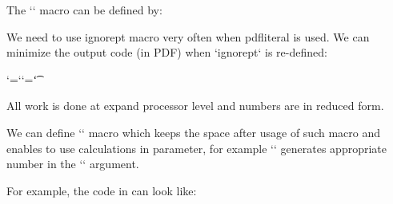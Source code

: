 The `\circletext` macro can be defined by: 

\begtt
\newdimen\tmpdimA 
\def\circletext#1#2#3#4{\hbox\bgroup 
    \tmpdim=14668pt \tmpdimA=#1 \divide\tmpdimA by256 \divide\tmpdim by\tmpdimA 
    \edef\tmpC{\expandafter\ignorept\the\tmpdim}%
    \setbox0=\hbox{\ifdim#1<0pt X\fi}%
    \tmpdimA=0pt \baselineskip=#1 \advance\baselineskip by-\ht0 \lineskiplimit=-\maxdimen 
    \tmpdim=#2pt \advance\tmpdim by-\ifdim#1<0pt-\fi 90pt 
    \def\tmpb{{}#3}\replacestrings{ }{{ }}#4%
    \pdfsave \pdfrotate{\expandafter\ignorept\the\tmpdim}%
    \expandafter\circletextA\tmpb\relax 
} 
\def\circletextA#1{\ifx#1\relax\pdfrestore\egroup\ignorespaces\else 
    \ifx^#1^\else \setbox0=\hbox{#1\circletextS}%
       \ifdim\tmpdimA=0pt \else 
          \advance\tmpdimA by.5\wd0 \dimen0=\tmpC\tmpdimA 
          \pdfrotate{-\expandafter\ignorept\the\dimen0}%
       \fi 
       \tmpdimA=.5\wd0 
       \vbox to0pt{\vss\hbox to0pt{\hss#1\hss}\null}%
    \fi 
    \expandafter\circletextA\fi 
} 
\def\kpcirc#1#2#3{\replacestrings{#1#2}{#1{\kern#3em}#2}} 
\def\circletextS{} 
\endtt

 


We need to use {\tt{}}ignorept macro very often when {\tt{}}pdfliteral is used. We can minimize the output code (in PDF) when `ignorept` is re-defined: 

\begtt
\begingroup \lccode`\?=`\p \lccode`\!=`\t \lowercase{\endgroup 
   \def\ignorept #1.#2?!{%
       \ifnum#2=0 #1\else \ifnum#1=0 \expandafter\remzero\fi #1.#2\fi} 
} 
\def\remzero #10{#1}%
\endtt


All work is done at expand processor level and numbers are in reduced form. 



We can define `\nopt[param]` macro which keeps the space after usage of such macro and enables to use calculations in parameter, for example `\nopt[1.65\hoffset + 1in]` generates appropriate number in the `\pdfliteral` argument. 

\begtt
\def\nopt[#1]{\expandafter\ignorept\the\dimexpr #1\relax} 
\endtt


For example, the code in  can look like: 

\begtt
\def\prepghook{\dimen0=.996264truein  
  \pdfliteral{q \bgcolor\space k -0.996264 0 0 0.996264 -\nopt[\dimen0] \nopt[\dimen0] cm  
  \nopt[\hoffset] \nopt[\voffset] -\nopt[\pdfpagewidth] -\nopt[\pdfpageheight] re f Q}} 
\endtt


